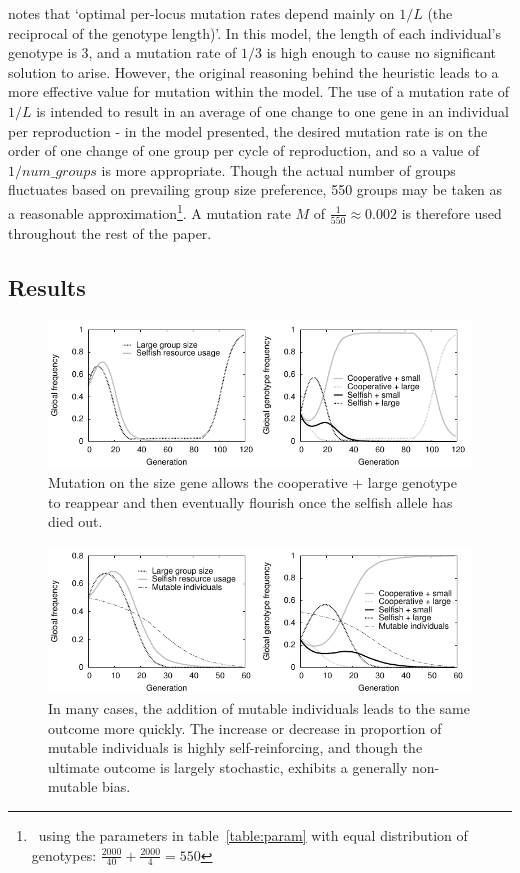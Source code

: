 \documentclass[11pt]{article}
\begin{document}
\citet{optimal} notes that `optimal per-locus mutation rates depend mainly on $1/L$ (the reciprocal of the genotype length)'. In this model, the length of each individual's genotype is 3, and a mutation rate of $1/3$ is high enough to cause no significant solution to arise. %
However, the original reasoning behind the heuristic leads to a more effective value for mutation within the model. The use of a mutation rate of $1/L$ is intended to result in an average of one change to one gene in an individual per reproduction - in the model presented, the desired mutation rate is on the order of one change of one group per cycle of reproduction, and so a value of $1/num\_groups$ is more appropriate. Though the actual number of groups fluctuates based on prevailing group size preference, 550 groups may be taken as a reasonable approximation\footnote{~using the parameters in table~\ref{table:param} with equal distribution of genotypes: $\frac{2000}{40} + \frac{2000}{4} = 550$}. A mutation rate $M$ of $\frac{1}{550} \approx 0.002$ is therefore used throughout the rest of the paper.
\subsection{Results}
\begin{figure}[!ht]
  \centering
  \includegraphics{sizeplot.pdf}
  \caption{Mutation on the size gene allows the cooperative + large genotype to reappear and then eventually flourish once the selfish allele has died out.}
  \label{fig:sizeplot}
\end{figure}
\begin{figure}[!ht]
  \centering
  \includegraphics{60geneqmutfix.pdf}
  \caption{In many cases, the addition of mutable individuals leads to the same outcome more quickly. The increase or decrease in proportion of mutable individuals is highly self-reinforcing, and though the ultimate outcome is largely stochastic, exhibits a generally non-mutable bias.}
  \label{fig:60geneqmutfix}
\end{figure}
\end{document}
